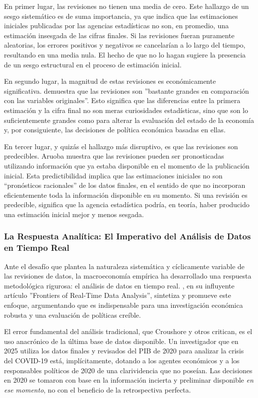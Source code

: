 \documentclass{article}
\begin{document}
En primer lugar, las revisiones no tienen una media de cero. Este hallazgo de un sesgo sistemático es de suma importancia, ya que indica que las estimaciones iniciales publicadas por las agencias estadísticas no son, en promedio, una estimación insesgada de las cifras finales. Si las revisiones fueran puramente aleatorias, los errores positivos y negativos se cancelarían a lo largo del tiempo, resultando en una media nula. El hecho de que no lo hagan sugiere la presencia de un sesgo estructural en el proceso de estimación inicial.

En segundo lugar, la magnitud de estas revisiones es económicamente significativa. \citet{aruoba2008} demuestra que las revisiones son ''bastante grandes en comparación con las variables originales''. Esto significa que las diferencias entre la primera estimación y la cifra final no son meras curiosidades estadísticas, sino que son lo suficientemente grandes como para alterar la evaluación del estado de la economía y, por consiguiente, las decisiones de política económica basadas en ellas.

En tercer lugar, y quizás el hallazgo más disruptivo, es que las revisiones son predecibles. Aruoba muestra que las revisiones pueden ser pronosticadas utilizando información que ya estaba disponible en el momento de la publicación inicial. Esta predictibilidad implica que las estimaciones iniciales no son ``pronósticos racionales'' de los datos finales, en el sentido de que no incorporan eficientemente toda la información disponible en su momento. Si una revisión es predecible, significa que la agencia estadística podría, en teoría, haber producido una estimación inicial mejor y menos sesgada.

\subsubsection{La Respuesta Analítica: El Imperativo del Análisis de Datos en Tiempo Real}

Ante el desafío que plantea la naturaleza sistemática y cíclicamente variable de las revisiones de datos, la macroeconomía empírica ha desarrollado una respuesta metodológica rigurosa: el análisis de datos en tiempo real. \citet{croushore2011}, en su influyente artículo ''Frontiers of Real-Time Data Analysis'', sintetiza y promueve este enfoque, argumentando que es indispensable para una investigación económica robusta y una evaluación de políticas creíble.

El error fundamental del análisis tradicional, que Croushore y otros critican, es el uso anacrónico de la última base de datos disponible. Un investigador que en 2025 utiliza los datos finales y revisados del PIB de 2020 para analizar la crisis del COVID-19 está, implícitamente, dotando a los agentes económicos y a los responsables políticos de 2020 de una clarividencia que no poseían. Las decisiones en 2020 se tomaron con base en la información incierta y preliminar disponible \textit{en ese momento}, no con el beneficio de la retrospectiva perfecta.
\end{document}
